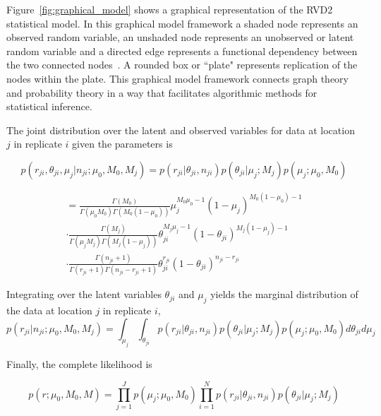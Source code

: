 \documentclass[11pt,reqno]{amsart}
\begin{document}
Figure~\ref{fig:graphical_model} shows a graphical representation of the RVD2 statistical model. In this graphical model framework a shaded node represents an observed random variable, an unshaded node represents an unobserved or latent random variable and a directed edge represents a functional dependency between the two connected nodes~\cite{}. A rounded box or ``plate" represents replication of the nodes within the plate. This graphical model framework connects graph theory and probability theory in a way that facilitates algorithmic methods for statistical inference.

The joint distribution over the latent and observed variables for data at location $j$ in replicate $i$ given the parameters is

\begin{equation}\label{eqn:jointpdf}
p \left( r_{ji}, \theta_{ji}, \mu_j | n_{ji}; \mu_0, M_0, M_j \right) = p \left( r_{ji} | \theta_{ji}, n_{ji} \right) p\left( \theta_{ji} | \mu_j; M_j \right) p\left( \mu_j; \mu_0, M_0 \right)
\end{equation}

\begin{gather}
= \frac{ \Gamma(M_0) } { \Gamma(\mu_0 M_0) \Gamma(M_0 (1-\mu_0)) } \mu_j^{M_0\mu_0 -1} (1 - \mu_j)^{M_0 ( 1 - \mu_0) - 1} \\
\cdot \frac{ \Gamma(M_j) } { \Gamma(\mu_j M_j) \Gamma(M_j (1-\mu_j)) } \theta_{ji}^{M_j\mu_j -1} (1 - \theta_{ji})^{M_j ( 1 - \mu_j) - 1} \\
\cdot \frac{ \Gamma(n_{ji}+1) } { \Gamma(r_{ji}+1) \Gamma( n_{ji} - r_{ji} + 1 ) } \theta_{ji}^{r_{ji}} (1 - \theta_{ji})^{n_{ji} - r_{ji}}
\end{gather}

Integrating over the latent variables $\theta_{ji}$ and $\mu_j$ yields the marginal distribution of the data at location $j$ in replicate $i$, 
\begin{equation}
p \left( r_{ji} | n_{ji} ; \mu_0, M_0, M_j \right) = \int_{\mu_j} \int_{\theta_{ji}}  p \left( r_{ji} | \theta_{ji}, n_{ji} \right) p\left( \theta_{ji} | \mu_j; M_j \right) p\left( \mu_j; \mu_0, M_0 \right) d\theta_{ji} d\mu_j
\end{equation}

Finally, the complete likelihood is

\begin{equation}
p \left( r ; \mu_0, M_0, M \right) = \prod_{j=1}^J p\left( \mu_j; \mu_0, M_0 \right) \prod_{i=1}^N p \left( r_{ji} | \theta_{ji}, n_{ji} \right) p\left( \theta_{ji} | \mu_j; M_j \right) 
\end{equation}
\end{document}
